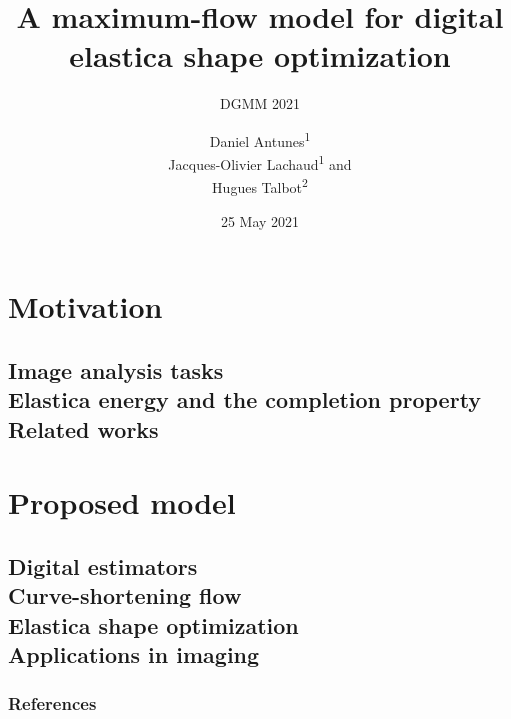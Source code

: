 \documentclass{beamer}
\title{A maximum-flow model for digital elastica shape optimization}
\subtitle{DGMM 2021}
\author{  
  {Daniel Antunes\textsuperscript{1} \\ Jacques-Olivier Lachaud\textsuperscript{1} and \\ Hugues Talbot\textsuperscript{2}}
}
\date
  {25 May 2021}
\institute
  {
	\textsuperscript{1}LAMA, Université Savoie Mont Blanc \\ 
	\textsuperscript{2}CentraleSupélec, Université Paris-Saclay
  }
\begin{document}
\captionsetup[subfigure]{labelformat=empty}

\begin{frame}
	\maketitle
\end{frame}



\section*{Motivation}
\subsection{Image analysis tasks \\[1em] Elastica energy and the completion property \\[1em] Related works}





\section*{Proposed model}
\subsection{Digital estimators \\[1em]Curve-shortening flow \\[1em]Elastica shape optimization \\[1em] Applications in imaging}









\begin{frame}[allowframebreaks]
    \frametitle{References}	
    \printbibliography
\end{frame}
\end{document}
